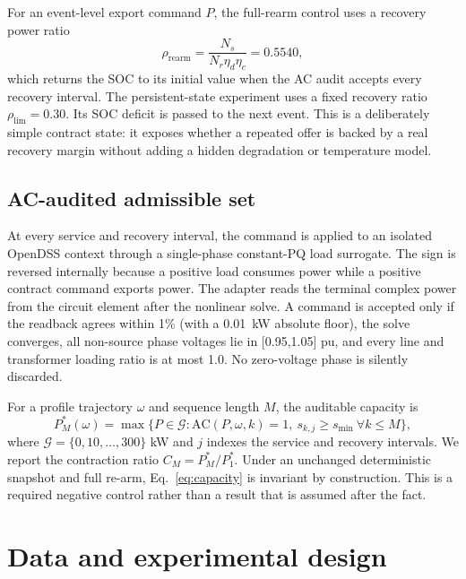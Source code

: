 \documentclass[11pt]{article}
\newcommand{\pmax}{P^{\ast}}
\begin{document}
For an event-level export command $P$, the full-rearm control uses a recovery power ratio
\begin{equation}
\rho_{\mathrm{rearm}}=\frac{N_s}{N_r\eta_d\eta_c}=0.5540,
\end{equation}
which returns the SOC to its initial value when the AC audit accepts every recovery interval. The persistent-state experiment uses a fixed recovery ratio $\rho_{\mathrm{lim}}=0.30$. Its SOC deficit is passed to the next event. This is a deliberately simple contract state: it exposes whether a repeated offer is backed by a real recovery margin without adding a hidden degradation or temperature model.

\subsection{AC-audited admissible set}
At every service and recovery interval, the command is applied to an isolated OpenDSS context through a single-phase constant-PQ load surrogate. The sign is reversed internally because a positive load consumes power while a positive contract command exports power. The adapter reads the terminal complex power from the circuit element after the nonlinear solve. A command is accepted only if the readback agrees within 1\% (with a \SI{0.01}{kW} absolute floor), the solve converges, all non-source phase voltages lie in [0.95,1.05] pu, and every line and transformer loading ratio is at most 1.0. No zero-voltage phase is silently discarded.

For a profile trajectory $\omega$ and sequence length $M$, the auditable capacity is
\begin{equation}
\pmax_M(\omega)=\max\{P\in\mathcal{G}: \text{AC}(P,\omega,k)=1,\ s_{k,j}\ge s_{\min}\ \forall k\le M\},
\label{eq:capacity}
\end{equation}
where $\mathcal{G}=\{0,10,\ldots,300\}$ kW and $j$ indexes the service and recovery intervals. We report the contraction ratio $C_M=\pmax_M/\pmax_1$. Under an unchanged deterministic snapshot and full re-arm, Eq.~\eqref{eq:capacity} is invariant by construction. This is a required negative control rather than a result that is assumed after the fact.

\section{Data and experimental design}
\end{document}
